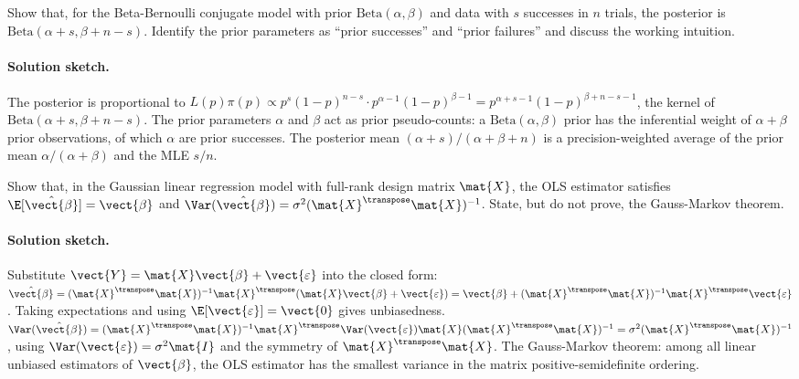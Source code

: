 \begin{exercise}
Show that, for the Beta-Bernoulli conjugate model with prior
$\mathrm{Beta}(\alpha, \beta)$ and data with $s$ successes in $n$
trials, the posterior is $\mathrm{Beta}(\alpha + s, \beta + n - s)$.
Identify the prior parameters as ``prior successes'' and ``prior
failures'' and discuss the working intuition.

\paragraph{Solution sketch.} The posterior is proportional to
$L(p) \pi(p) \propto p^{s}(1-p)^{n-s} \cdot p^{\alpha-1}
(1-p)^{\beta-1} = p^{\alpha+s-1}(1-p)^{\beta+n-s-1}$, the kernel
of $\mathrm{Beta}(\alpha + s, \beta + n - s)$. The prior
parameters $\alpha$ and $\beta$ act as prior pseudo-counts: a
$\mathrm{Beta}(\alpha, \beta)$ prior has the inferential weight of
$\alpha + \beta$ prior observations, of which $\alpha$ are prior
successes. The posterior mean $(\alpha + s)/(\alpha + \beta + n)$
is a precision-weighted average of the prior mean $\alpha/
(\alpha+\beta)$ and the MLE $s/n$.
\end{exercise}

\begin{exercise}
Show that, in the Gaussian linear regression model with full-rank
design matrix $\mat{X}$, the OLS estimator satisfies
$\E[\hat{\vect{\beta}}] = \vect{\beta}$ and $\Var(\hat{\vect{\beta}})
= \sigma^{2}(\mat{X}^{\transpose}\mat{X})^{-1}$. State, but do not
prove, the Gauss-Markov theorem.

\paragraph{Solution sketch.} Substitute $\vect{Y} = \mat{X}
\vect{\beta} + \vect{\varepsilon}$ into the closed form:
$\hat{\vect{\beta}} = (\mat{X}^{\transpose}\mat{X})^{-1}
\mat{X}^{\transpose}(\mat{X}\vect{\beta} + \vect{\varepsilon}) =
\vect{\beta} + (\mat{X}^{\transpose}\mat{X})^{-1}
\mat{X}^{\transpose}\vect{\varepsilon}$. Taking expectations and
using $\E[\vect{\varepsilon}] = \vect{0}$ gives unbiasedness.
$\Var(\hat{\vect{\beta}}) = (\mat{X}^{\transpose}\mat{X})^{-1}
\mat{X}^{\transpose}\Var(\vect{\varepsilon})\mat{X}
(\mat{X}^{\transpose}\mat{X})^{-1} = \sigma^{2}(\mat{X}^{\transpose}
\mat{X})^{-1}$, using
$\Var(\vect{\varepsilon}) = \sigma^{2}\mat{I}$ and the
symmetry of $\mat{X}^{\transpose}\mat{X}$. The Gauss-Markov
theorem: among all linear unbiased estimators of $\vect{\beta}$,
the OLS estimator has the smallest variance in the matrix
positive-semidefinite ordering.
\end{exercise}

